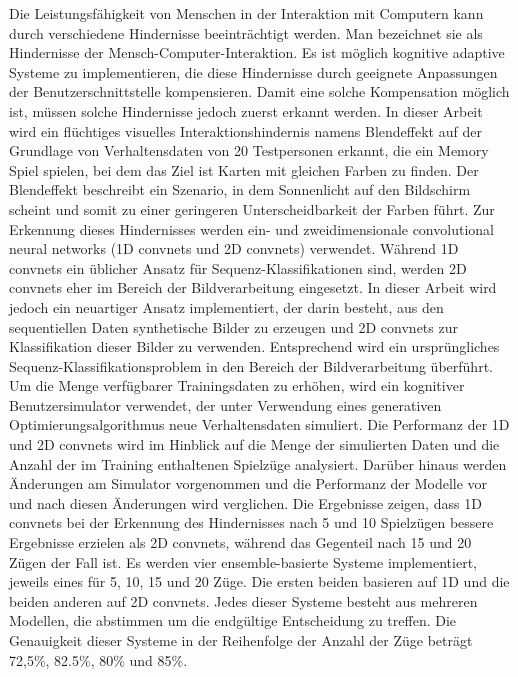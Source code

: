 

\begin{abstractgerman}
Die Leistungsfähigkeit von Menschen in der Interaktion mit Computern kann durch verschiedene Hindernisse beeinträchtigt werden. Man bezeichnet sie als Hindernisse der Mensch-Computer-Interaktion. Es ist möglich kognitive adaptive Systeme zu implementieren, die diese Hindernisse durch geeignete Anpassungen der Benutzerschnittstelle kompensieren. Damit eine solche Kompensation möglich ist, müssen solche Hindernisse jedoch zuerst erkannt werden. In dieser Arbeit wird ein flüchtiges visuelles Interaktionshindernis namens Blendeffekt auf der Grundlage von Verhaltensdaten von 20 Testpersonen erkannt, die ein Memory Spiel spielen, bei dem das Ziel ist Karten mit gleichen Farben zu finden. Der Blendeffekt beschreibt ein Szenario, in dem Sonnenlicht auf den Bildschirm scheint und somit zu einer geringeren Unterscheidbarkeit der Farben führt. Zur Erkennung dieses Hindernisses werden ein- und zweidimensionale convolutional neural networks (1D convnets und 2D convnets) verwendet. Während 1D convnets ein üblicher Ansatz für Sequenz-Klassifikationen sind, werden 2D convnets eher im Bereich der Bildverarbeitung eingesetzt. In dieser Arbeit wird jedoch ein neuartiger Ansatz implementiert, der darin besteht, aus den sequentiellen Daten synthetische Bilder zu erzeugen und 2D convnets zur Klassifikation dieser Bilder zu verwenden. Entsprechend wird ein ursprüngliches Sequenz-Klassifikationsproblem in den Bereich der Bildverarbeitung überführt. Um die Menge verfügbarer Trainingsdaten zu erhöhen, wird ein kognitiver Benutzersimulator verwendet, der unter Verwendung eines generativen Optimierungsalgorithmus neue Verhaltensdaten simuliert. Die Performanz der 1D und 2D convnets wird im Hinblick auf die Menge der simulierten Daten und die Anzahl der im Training enthaltenen Spielzüge analysiert. Darüber hinaus werden Änderungen am Simulator vorgenommen und die Performanz der Modelle vor und nach diesen Änderungen wird verglichen. Die Ergebnisse zeigen, dass 1D convnets bei der Erkennung des Hindernisses nach 5 und 10 Spielzügen bessere Ergebnisse erzielen als 2D convnets, während das Gegenteil nach 15 und 20 Zügen der Fall ist. Es werden vier ensemble-basierte Systeme implementiert, jeweils eines für 5, 10, 15 und 20 Züge. Die ersten beiden basieren auf 1D und die beiden anderen auf 2D convnets. Jedes dieser Systeme besteht aus mehreren Modellen, die abstimmen um die endgültige Entscheidung zu treffen. Die Genauigkeit dieser Systeme in der Reihenfolge der Anzahl der Züge beträgt 72,5\%, 82.5\%, 80\% und 85\%.  

\clearpage
\end{abstractgerman}
\newpage

